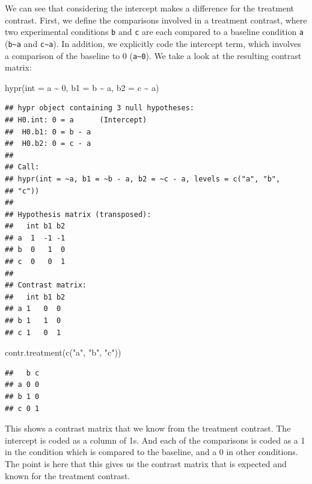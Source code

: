 \documentclass[
  12pt,
]{krantz}
\newenvironment{Shaded}{\begin{snugshade}}{\end{snugshade}}
\newcommand{\AttributeTok}[1]{\textcolor[rgb]{0.77,0.63,0.00}{#1}}
\newcommand{\DecValTok}[1]{\textcolor[rgb]{0.00,0.00,0.81}{#1}}
\newcommand{\FunctionTok}[1]{\textcolor[rgb]{0.00,0.00,0.00}{#1}}
\newcommand{\NormalTok}[1]{#1}
\newcommand{\SpecialCharTok}[1]{\textcolor[rgb]{0.00,0.00,0.00}{#1}}
\newcommand{\StringTok}[1]{\textcolor[rgb]{0.31,0.60,0.02}{#1}}
\theoremstyle{definition}
\theoremstyle{definition}
\theoremstyle{definition}
\theoremstyle{definition}
\theoremstyle{remark}
\begin{document}
We can see that considering the intercept makes a difference for the treatment contrast. First, we define the comparisons involved in a treatment contrast, where two experimental conditions \texttt{b} and \texttt{c} are each compared to a baseline condition \texttt{a} (\texttt{b\textasciitilde{}a} and \texttt{c\textasciitilde{}a}). In addition, we explicitly code the intercept term, which involves a comparison of the baseline to 0 (\texttt{a\textasciitilde{}0}). We take a look at the resulting contrast matrix:

\begin{Shaded}
\begin{Highlighting}[]
\FunctionTok{hypr}\NormalTok{(}\AttributeTok{int =}\NormalTok{ a }\SpecialCharTok{\textasciitilde{}} \DecValTok{0}\NormalTok{, }\AttributeTok{b1 =}\NormalTok{ b }\SpecialCharTok{\textasciitilde{}}\NormalTok{ a, }\AttributeTok{b2 =}\NormalTok{ c }\SpecialCharTok{\textasciitilde{}}\NormalTok{ a)}
\end{Highlighting}
\end{Shaded}

\begin{verbatim}
## hypr object containing 3 null hypotheses:
## H0.int: 0 = a      (Intercept)
##  H0.b1: 0 = b - a
##  H0.b2: 0 = c - a
## 
## Call:
## hypr(int = ~a, b1 = ~b - a, b2 = ~c - a, levels = c("a", "b", 
## "c"))
## 
## Hypothesis matrix (transposed):
##   int b1 b2
## a  1  -1 -1
## b  0   1  0
## c  0   0  1
## 
## Contrast matrix:
##   int b1 b2
## a 1   0  0 
## b 1   1  0 
## c 1   0  1
\end{verbatim}

\begin{Shaded}
\begin{Highlighting}[]
\FunctionTok{contr.treatment}\NormalTok{(}\FunctionTok{c}\NormalTok{(}\StringTok{"a"}\NormalTok{, }\StringTok{"b"}\NormalTok{, }\StringTok{"c"}\NormalTok{))}
\end{Highlighting}
\end{Shaded}

\begin{verbatim}
##   b c
## a 0 0
## b 1 0
## c 0 1
\end{verbatim}

This shows a contrast matrix that we know from the treatment contrast. The intercept is coded as a column of 1s. And each of the comparisons is coded as a 1 in the condition which is compared to the baseline, and a 0 in other conditions. The point is here that this gives us the contrast matrix that is expected and known for the treatment contrast.
\end{document}
